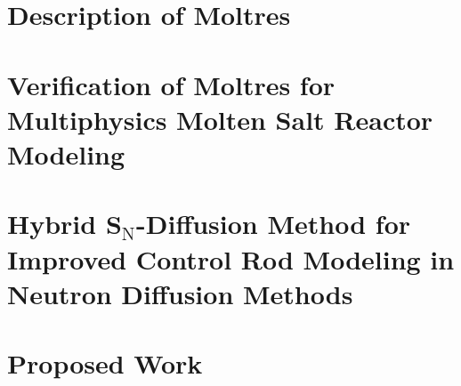 \documentclass[edeposit,fullpage,11pt]{uiucthesis2021}
\begin{document}
\chapter{Description of Moltres}
\label{chap:moltres}
%
\glsresetall

\chapter{Verification of Moltres for Multiphysics Molten Salt
Reactor Modeling}
\label{chap:benchmark}
%
\glsresetall

\chapter{Hybrid S$_\text{N}$-Diffusion Method for Improved Control Rod Modeling
in Neutron Diffusion Methods}
\label{chap:hybrid}

\glsresetall

\chapter{Proposed Work}
\label{chap:proposedwork}
%
\glsresetall

\backmatter



\end{document}
